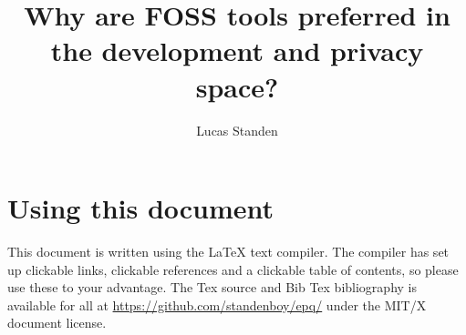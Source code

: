 \documentclass[a4paper,12pt]{article}
\author{Lucas Standen} \title{Why are FOSS tools preferred in the development and privacy space?}
\begin{document}
 
\maketitle

\newpage

\section{Using this document} This document is written using the {\LaTeX} text compiler. The compiler has set up
clickable links, clickable references and a clickable table of contents, so please use these to your advantage.
The Tex source and Bib Tex bibliography is available for all at \url{https://github.com/standenboy/epq/} under
the MIT/X document license.

\tableofcontents 
\newpage

\setlength{\parskip}{1em}
\end{document}
